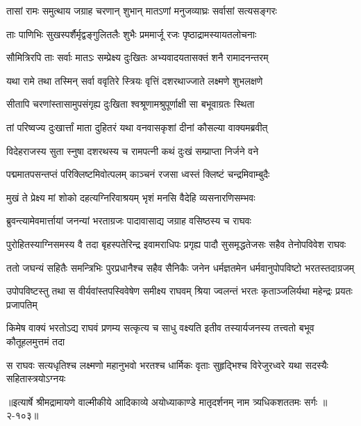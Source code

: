 \twolineshloka
{तासां रामः समुत्थाय जग्राह चरणान् शुभान्}
{मातऽणां मनुजव्याघ्रः सर्वासां सत्यसङ्गरः} %

\twolineshloka
{ताः पाणिभिः सुखस्पर्शैर्मृद्वङ्गुलितलैः शुभैः}
{प्रममार्जू रजः पृष्ठाद्रामस्यायतलोचनाः} %

\twolineshloka
{सौमित्रिरपि ताः सर्वाः मातऽः सम्प्रेक्ष्य दुःखितः}
{अभ्यवादयतासक्तं शनै रामादनन्तरम्} %

\twolineshloka
{यथा रामे तथा तस्मिन् सर्वा ववृतिरे स्त्रियः}
{वृत्तिं दशरथाज्जाते लक्ष्मणे शुभलक्षणे} %

\twolineshloka
{सीतापि चरणांस्तासामुपसंगृह्य दुःखिता}
{श्वश्रूणामश्रुपूर्णाक्षी सा बभूवाग्रतः स्थिता} %

\twolineshloka
{तां परिष्वज्य दुःखार्त्तां माता दुहितरं यथा}
{वनवासकृशां दीनां कौसल्या वाक्यमब्रवीत्} %

\twolineshloka
{विदेहराजस्य सुता स्नुषा दशरथस्य च}
{रामपत्नी कथं दुःखं सम्प्राप्ता निर्जने वने} %

\twolineshloka
{पद्ममातपसन्तप्तं परिक्लिष्टमिवोत्पलम्}
{काञ्चनं रजसा ध्वस्तं क्लिष्टं चन्द्रमिवाम्बुदैः} %

\onelineshloka
{मुखं ते प्रेक्ष्य मां शोको दहत्यग्निरिवाश्रयम् भृशं मनसि वैदेहि व्यसनारणिसम्भवः} %

\twolineshloka
{ब्रुवन्त्यामेवमार्त्तायां जनन्यां भरताग्रजः}
{पादावासाद्य जग्राह वसिष्ठस्य च राघवः} %

\twolineshloka
{पुरोहितस्याग्निसमस्य वै तदा बृहस्पतेरिन्द्र इवामराधिपः}
{प्रगृह्य पादौ सुसमृद्धतेजसः सहैव तेनोपविवेश राघवः} %

\twolineshloka
{ततो जघन्यं सहितैः समन्त्रिभिः पुरप्रधानैश्च सहैव सैनिकैः}
{जनेन धर्मज्ञतमेन धर्मवानुपोपविष्टो भरतस्तदाग्रजम्} %

\twolineshloka
{उपोपविष्टस्तु तथा स वीर्यवांस्तपस्विवेषेण समीक्ष्य राघवम्}
{श्रिया ज्वलन्तं भरतः कृताञ्जलिर्यथा महेन्द्रः प्रयतः प्रजापतिम्} %

\twolineshloka
{किमेष वाक्यं भरतोऽद्य राघवं प्रणम्य सत्कृत्य च साधु वक्ष्यति}
{इतीव तस्यार्यजनस्य तत्त्वतो बभूव कौतूहलमुत्तमं तदा} %

\twolineshloka
{स राघवः सत्यधृतिश्च लक्ष्मणो महानुभवो भरतश्च धार्मिकः}
{वृताः सुहृद्भिश्च विरेजुरध्वरे यथा सदस्यैः सहितास्त्रयोऽग्नयः} %


॥इत्यार्षे श्रीमद्रामायणे वाल्मीकीये आदिकाव्ये अयोध्याकाण्डे मातृदर्शनम् नाम त्र्यधिकशततमः सर्गः ॥२-१०३॥
